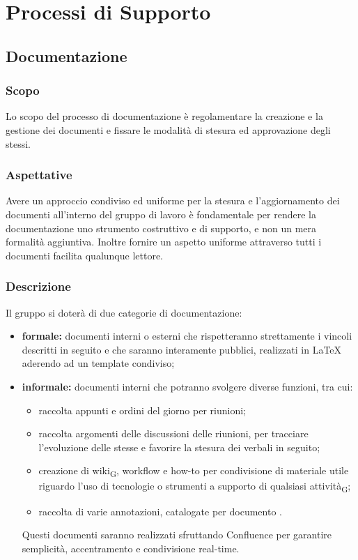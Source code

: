 \section{Processi di Supporto}
\label{supporto}
\subsection{Documentazione}
    \subsubsection{Scopo}
    Lo scopo del processo di documentazione è regolamentare la creazione e la gestione dei documenti e fissare le modalità di stesura ed approvazione degli stessi.
    \subsubsection{Aspettative}
    Avere un approccio condiviso ed uniforme per la stesura e l'aggiornamento dei documenti all'interno del gruppo di lavoro è fondamentale per rendere la documentazione uno strumento costruttivo e di supporto, e non un mera formalità aggiuntiva.
    Inoltre fornire un aspetto uniforme attraverso tutti i documenti facilita qualunque lettore.
    \subsubsection{Descrizione}
    Il gruppo \group si doterà di due categorie di documentazione:
    \begin{itemize}
        \item \textbf{formale: }documenti interni o esterni che rispetteranno strettamente i vincoli descritti in seguito e che saranno interamente pubblici, realizzati in \LaTeX{} aderendo ad un template condiviso;
        \item \textbf{informale: }documenti interni che potranno svolgere diverse funzioni, tra cui:
        \begin{itemize}
            \item  raccolta appunti e ordini del giorno per riunioni;
            \item  raccolta argomenti delle discussioni delle riunioni, per tracciare l'evoluzione delle stesse e favorire la stesura dei verbali in seguito;
            \item  creazione di wiki\textsubscript{G}, workflow e how-to per condivisione di materiale utile riguardo l'uso di tecnologie o strumenti a supporto di qualsiasi attività\textsubscript{G};
            \item raccolta di varie annotazioni, catalogate per documento .
        \end{itemize}
        Questi documenti saranno realizzati sfruttando Confluence per garantire semplicità, accentramento e condivisione real-time.

    \end{itemize}
